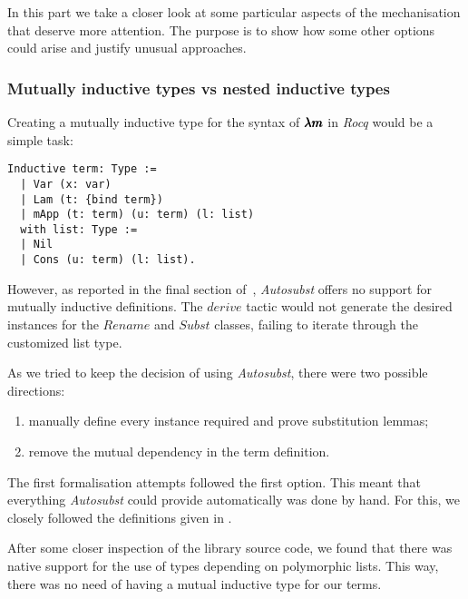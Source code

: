 In this part we take a closer look at some particular aspects of the mechanisation that deserve more attention.
The purpose is to show how some other options could arise and justify unusual approaches.

\subsubsection{Mutually inductive types vs nested inductive types}

Creating a mutually inductive type for the syntax of $\pmb{\lambda m}$ in \textit{Rocq} would be a simple task:
\begin{lstlisting}[language=Coq]
  Inductive term: Type :=
  | Var (x: var)
  | Lam (t: {bind term})
  | mApp (t: term) (u: term) (l: list)
  with list: Type :=
  | Nil
  | Cons (u: term) (l: list). 
\end{lstlisting}

However, as reported in the final section of~\cite{AutosubstSchafer}, \textit{Autosubst} offers no support for mutually inductive definitions.
The \lst$derive$ tactic would not generate the desired instances for the \lst$Rename$ and \lst$Subst$ classes, failing to iterate through the customized list type.

As we tried to keep the decision of using \textit{Autosubst}, there were two possible directions:
\begin{enumerate}
\item manually define every instance required and prove substitution lemmas;
\item remove the mutual dependency in the term definition.
\end{enumerate}

The first formalisation attempts followed the first option.
This meant that everything \textit{Autosubst} could provide automatically was done by hand.
For this, we closely followed the definitions given in \cite{AutosubstSchafer}.


After some closer inspection of the library source code, we found that there was native support for the use of types depending on polymorphic lists.
This way, there was no need of having a mutual inductive type for our terms.

